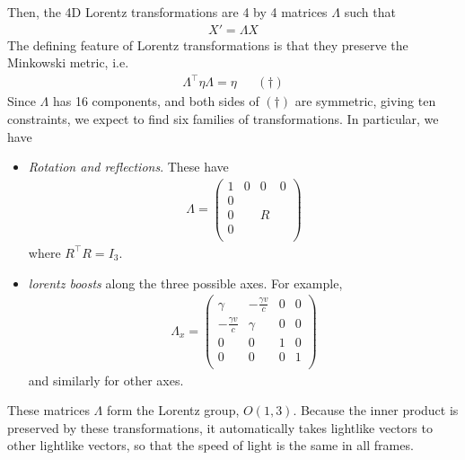 \documentclass{../../template/note}
\begin{document}
    Then, the 4D Lorentz transformations are 4 by 4 matrices \(\Lambda\) such that
    \begin{align*}
        X' = \Lambda X
    \end{align*}
    The defining feature of Lorentz transformations is that they preserve the Minkowski metric, i.e.
    \begin{align*}
        \Lambda^\intercal \eta \Lambda = \eta && (\dagger)
    \end{align*}
    Since \(\Lambda\) has 16 components, and both sides of \((\dagger)\) are symmetric, giving ten constraints, we expect to find six families of transformations. In particular, we have
    \begin{itemize}
        \item \emph{Rotation and reflections}. These have
        \begin{align*}
            \Lambda = \begin{pmatrix}
             1 & 0 & 0 & 0 \\
             0 &  &  &  \\
             0 &  & R &  \\
             0 &  &  &  \\
            \end{pmatrix}
        \end{align*}
        where \(R^\intercal R = I_3\).
        \item \emph{lorentz boosts} along the three possible axes. For example,
        \begin{align*}
            \Lambda_x = \begin{pmatrix}
             \gamma & -\frac{\gamma v}c & 0 & 0 \\
             -\frac{\gamma v}c & \gamma & 0 & 0 \\
             0 & 0 & 1 & 0 \\
             0 & 0 & 0 & 1 \\
            \end{pmatrix}
        \end{align*}
        and similarly for other axes.
    \end{itemize}
    These matrices \(\Lambda\) form the Lorentz group, \(O(1, 3)\). Because the inner product is preserved by these transformations, it automatically takes lightlike vectors to other lightlike vectors, so that the speed of light is the same in all frames.
\end{document}
